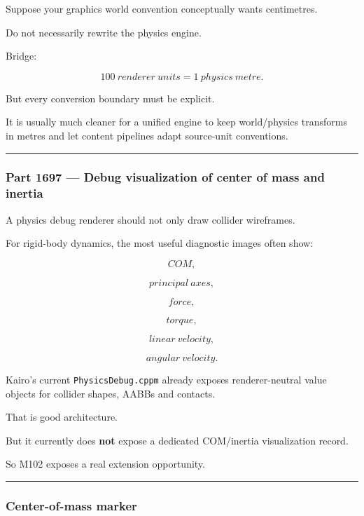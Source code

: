 Suppose your graphics world convention conceptually wants centimetres.

Do not necessarily rewrite the physics engine.

Bridge:

\[
100\ renderer\ units
=
1\ physics\ metre.
\]

But every conversion boundary must be explicit.

It is usually much cleaner for a unified engine to keep world/physics transforms in metres and let content pipelines adapt source-unit conventions.

\begin{center}\rule{0.5\linewidth}{0.5pt}\end{center}

\subsubsection{Part 1697 --- Debug visualization of center of mass and inertia}\label{part-1697-debug-visualization-of-center-of-mass-and-inertia}

A physics debug renderer should not only draw collider wireframes.

For rigid-body dynamics, the most useful diagnostic images often show:

\[
COM,
\]

\[
principal\ axes,
\]

\[
force,
\]

\[
torque,
\]

\[
linear\ velocity,
\]

\[
angular\ velocity.
\]

Kairo's current \texttt{PhysicsDebug.cppm} already exposes renderer-neutral value objects for collider shapes, AABBs and contacts.

That is good architecture.

But it currently does \textbf{not} expose a dedicated COM/inertia visualization record.

So M102 exposes a real extension opportunity.

\begin{center}\rule{0.5\linewidth}{0.5pt}\end{center}

\subsubsection{Center-of-mass marker}\label{center-of-mass-marker}

